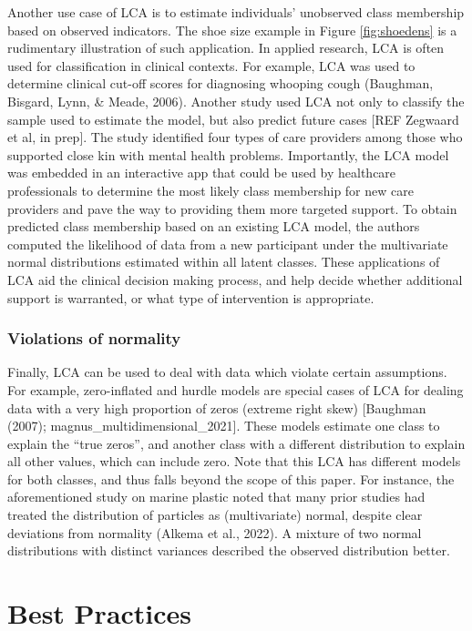 \documentclass[
  ,man,floatsintext]{apa6}
\begin{document}
Another use case of LCA is to estimate individuals' unobserved class membership based on observed indicators.
The shoe size example in Figure \ref{fig:shoedens}
is a rudimentary illustration of such application.
In applied research, LCA is often used for classification in clinical contexts.
For example, LCA was used to determine clinical cut-off scores for diagnosing whooping cough (Baughman, Bisgard, Lynn, \& Meade, 2006).
Another study used LCA not only to classify the sample used to estimate the model, but also predict future cases {[}REF Zegwaard et al, in prep{]}.
The study identified four types of care providers among those who supported close kin with mental health problems.
Importantly, the LCA model was embedded in an interactive app that could be used by healthcare professionals to determine the most likely class membership for new care providers and pave the way to providing them more targeted support.
To obtain predicted class membership based on an existing LCA model,
the authors computed the likelihood of data from a new participant under the multivariate normal distributions estimated within all latent classes.
These applications of LCA aid the clinical decision making process,
and help decide whether additional support is warranted,
or what type of intervention is appropriate.

\hypertarget{violations-of-normality}{%
\subsubsection{Violations of normality}\label{violations-of-normality}}

Finally, LCA can be used to deal with data which violate certain assumptions.
For example, zero-inflated and hurdle models are special cases of LCA for dealing data with a very high proportion of zeros (extreme right skew) {[}Baughman (2007); magnus\_multidimensional\_2021{]}.
These models estimate one class to explain the ``true zeros'',
and another class with a different distribution to explain all other values, which can include zero.
Note that this LCA has different models for both classes,
and thus falls beyond the scope of this paper.
For instance, the aforementioned study on marine plastic noted that many prior studies had treated the distribution of particles as (multivariate) normal, despite clear deviations from normality (Alkema et al., 2022).
A mixture of two normal distributions with distinct variances described the observed distribution better.

\hypertarget{best-practices}{%
\section{Best Practices}\label{best-practices}}
\end{document}
